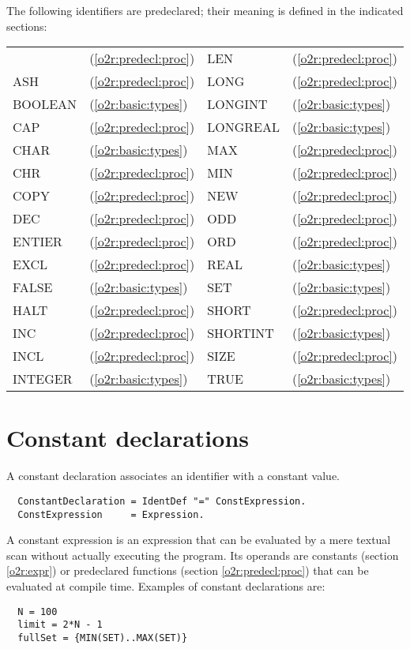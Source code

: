 The following identifiers are predeclared; their meaning is defined
in the indicated sections:
\begin{center}
\ifonline
\begin{tabular}{llll}
\else
\begin{tabular}{ll@{\hspace{2.0cm}}ll}
\fi
ABS     & (\ref{o2r:predecl:proc}) &  LEN      & (\ref{o2r:predecl:proc}) \\
ASH     & (\ref{o2r:predecl:proc}) &  LONG     & (\ref{o2r:predecl:proc}) \\
BOOLEAN & (\ref{o2r:basic:types})  &  LONGINT  & (\ref{o2r:basic:types})  \\
CAP     & (\ref{o2r:predecl:proc}) &  LONGREAL & (\ref{o2r:basic:types})  \\
CHAR    & (\ref{o2r:basic:types})  &  MAX      & (\ref{o2r:predecl:proc}) \\
CHR     & (\ref{o2r:predecl:proc}) &  MIN      & (\ref{o2r:predecl:proc}) \\
COPY    & (\ref{o2r:predecl:proc}) &  NEW      & (\ref{o2r:predecl:proc}) \\
DEC     & (\ref{o2r:predecl:proc}) &  ODD      & (\ref{o2r:predecl:proc}) \\
ENTIER  & (\ref{o2r:predecl:proc}) &  ORD      & (\ref{o2r:predecl:proc}) \\
EXCL    & (\ref{o2r:predecl:proc}) &  REAL     & (\ref{o2r:basic:types})  \\
FALSE   & (\ref{o2r:basic:types})  &  SET      & (\ref{o2r:basic:types})  \\
HALT    & (\ref{o2r:predecl:proc}) &  SHORT    & (\ref{o2r:predecl:proc}) \\
INC     & (\ref{o2r:predecl:proc}) &  SHORTINT & (\ref{o2r:basic:types})  \\
INCL    & (\ref{o2r:predecl:proc}) &  SIZE     & (\ref{o2r:predecl:proc}) \\
INTEGER & (\ref{o2r:basic:types})  &  TRUE     & (\ref{o2r:basic:types})  \\
\end{tabular}
\end{center}

\section{Constant declarations}

A constant declaration associates an identifier with a constant value.
{\BNFsize
\begin{verbatim}
  ConstantDeclaration = IdentDef "=" ConstExpression.
  ConstExpression     = Expression.
\end{verbatim}}
A constant expression is an expression that can be evaluated by a
mere textual scan without actually executing the program. Its operands
are constants (section \ref{o2r:expr}) or predeclared
functions (section \ref{o2r:predecl:proc}) that can be evaluated
at compile time.
Examples of constant declarations are:
\begin{verbatim}
  N = 100
  limit = 2*N - 1
  fullSet = {MIN(SET)..MAX(SET)}
\end{verbatim}

